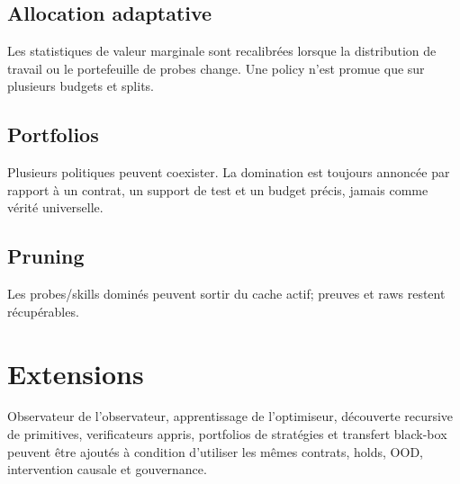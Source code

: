 \documentclass[11pt,a4paper]{report}
\begin{document}
\section{Allocation adaptative}
Les statistiques de valeur marginale sont recalibrées lorsque la distribution de travail ou le portefeuille de probes change. Une policy n'est promue que sur plusieurs budgets et splits.
\section{Portfolios}
Plusieurs politiques peuvent coexister. La domination est toujours annoncée par rapport à un contrat, un support de test et un budget précis, jamais comme vérité universelle.
\section{Pruning}
Les probes/skills dominés peuvent sortir du cache actif; preuves et raws restent récupérables.

\chapter{Extensions}
Observateur de l'observateur, apprentissage de l'optimiseur, découverte recursive de primitives, verificateurs appris, portfolios de stratégies et transfert black-box peuvent être ajoutés à condition d'utiliser les mêmes contrats, holds, OOD, intervention causale et gouvernance.
\end{document}
